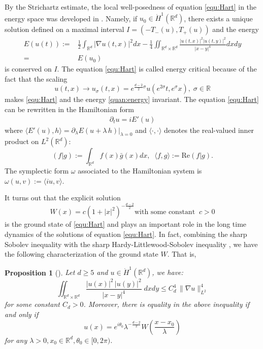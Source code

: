 \documentclass[reqno, 11pt]{amsart}
\numberwithin{equation}{section}
\newcommand{\R}{\mathbb{R}}
\theoremstyle{plain}
\newtheorem{proposition}[theorem]{Proposition}
\theoremstyle{definition}
\numberwithin{equation}{section}
\numberwithin{theorem}{section}
\numberwithin{equation}{section}
\renewcommand{\Re}{\mathrm{Re}}
\numberwithin{equation}{section}
\numberwithin{theorem}{section}
\begin{document}
	By the Strichartz estimate, the local well-posedness  of equation \eqref{equ:Hart} in the energy space was developed in \cite{Caz:book,MXZ:Cauchy}. Namely, if $u_0 \in \dot H^1(\R^d)$, there exists a unique solution defined on a maximal interval $I=\left(-T_-(u), T_+(u)\right)$ and the energy
	\begin{align}\label{quan:energy}
 E(u(t)):=&\frac12 \int_{\R^d} \big| \nabla u(t,x)\big|^2 dx-\frac{1}{4} \iint_{\R^d\times \R^d} \frac{\big|u(t,x)\big|^2\big|u(t,y)\big|^2}{|x-y|^4} dxdy\\
	=&E(u_0) \nonumber
	\end{align}
	is conserved on $I$.
The equation \eqref{equ:Hart} is called energy critical because of the fact that the scaling 
	\begin{equation*}
	u(t,x)\rightarrow u_\sigma (t,x) =e^{\frac{d-2}{2}\sigma }u(e^{2\sigma } t,
	e^{\sigma}x),\;  \sigma \in \R
	\end{equation*}
	makes \eqref{equ:Hart} and the energy \eqref{quan:energy} invariant. The equation \eqref{equ:Hart} can be rewritten in the Hamiltonian form 
	\begin{align*}
	\partial_t u = iE'(u)
	\end{align*}
	where $\langle E'(u), h\rangle=\partial_\lambda E (u+\lambda \, h) |_{\lambda =0}$ and $\langle\cdot,\cdot\rangle$ denotes the real-valued inner product on $L^2(\R^d)$:
	\begin{equation*}
	\left(f|g\right):=\int_{\R^d} f(x)\bar{g}(x)dx,\;\; \langle f,g\rangle:=\Re\left(f|g\right) .
	\end{equation*}
	The symplectic form $\omega$ associated to the Hamiltonian system is
	$
	\omega(u,v):=\langle iu,v \rangle . 
	$
	
	It turns out that the explicit solution
	\begin{equation*}
	W(x)=c \left(1 +|x|^2\right)^{-\frac{d-2}{2}} \text{with some constant}\;\;c>0
	\end{equation*}
	is the ground state of \eqref{equ:Hart} and plays an important role in the long time dynamics of the solutions of equation \eqref{equ:Hart}. In fact, combining the sharp Sobolev inequality \cite{Aubin, LiebL:book} with the sharp Hardy-Littlewood-Sobolev inequality \cite{Lieb:HLS:sp const, LiebL:book}, we have the  following characterization of the ground state $W$. That is, 
	
	\begin{proposition}[\cite{LiebL:book,MWX:Hart,MXZ:crit Hart:f rad}]\label{prop:sharp const} Let $d\geq 5$ and $ u \in \dot H^1(\R ^d)$, we have:
		\begin{equation*}
		\iint_{\R^d \times \R^d} \frac{|u(x)|^2\, |u(y)|^2}{|x-y|^4} \; dxdy	\leq C_d^4\, \|\nabla u \|^4_{L^2}
		\end{equation*} 	
		for some constant $C_d>0$.  Moreover, there is equality in the above inequality if and only if  $$ u(x)=e^{i\theta_0}\lambda ^{-\frac{d-2}{2}} W\left(\frac{x-x_0}{\lambda} \right) $$ for any $\lambda>0, x_0\in {\R}^d,\theta_0\in [0,2\pi)$. 
	\end{proposition}
	
\end{document}
